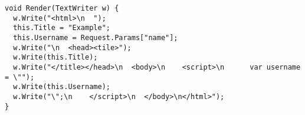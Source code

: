 {\ssp
\begin{lstlisting}[language={[Sharp]C}, caption=The compiled \csh output of Listing~\ref{code:simple-aspx}., label=code:simple-compiled-cs, float]
void Render(TextWriter w) {
  w.Write("<html>\n  ");
  this.Title = "Example";
  this.Username = Request.Params["name"];
  w.Write("\n  <head><tile>");
  w.Write(this.Title);
  w.Write("</title></head>\n  <body>\n    <script>\n      var username = \"");
  w.Write(this.Username);
  w.Write("\";\n    </script>\n  </body>\n</html>");
}
\end{lstlisting}
}

